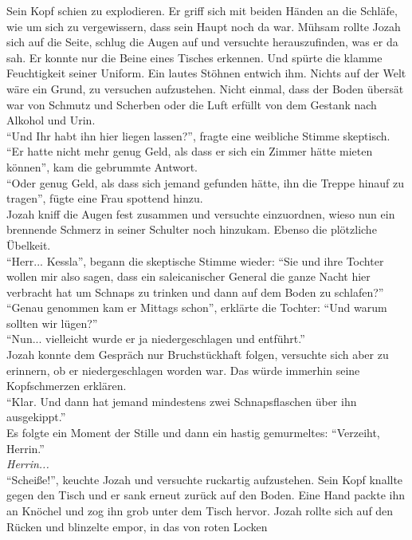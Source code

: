 Sein Kopf schien zu explodieren. Er griff sich mit beiden Händen an die Schläfe, wie um sich zu 
vergewissern, dass sein Haupt noch da war. Mühsam rollte Jozah sich auf die Seite, schlug die Augen 
auf und versuchte herauszufinden, was er da sah. Er konnte nur die Beine eines Tisches erkennen. 
Und spürte die klamme Feuchtigkeit seiner Uniform. Ein lautes Stöhnen entwich ihm. Nichts auf der 
Welt wäre ein Grund, zu versuchen aufzustehen. Nicht einmal, dass der Boden übersät war von 
Schmutz und Scherben oder die Luft erfüllt von dem Gestank nach Alkohol und Urin.\\
``Und Ihr habt ihn hier liegen lassen?'', fragte eine weibliche Stimme skeptisch.\\
``Er hatte nicht mehr genug Geld, als dass er sich ein Zimmer hätte mieten können'', kam die 
gebrummte Antwort.\\
``Oder genug Geld, als dass sich jemand gefunden hätte, ihn die Treppe hinauf zu tragen'', fügte 
eine Frau spottend hinzu.\\
Jozah kniff die Augen fest zusammen und versuchte einzuordnen, wieso nun ein brennende Schmerz in 
seiner Schulter noch hinzukam. Ebenso die plötzliche Übelkeit.\\
``Herr... Kessla'', begann die skeptische Stimme wieder: ``Sie und ihre Tochter wollen mir also 
sagen, dass ein saleicanischer General die ganze Nacht hier verbracht hat um Schnaps zu trinken und 
dann auf dem Boden zu schlafen?''\\
``Genau genommen kam er Mittags schon'', erklärte die Tochter: ``Und warum sollten wir lügen?''\\
``Nun... vielleicht wurde er ja niedergeschlagen und entführt.''\\
Jozah konnte dem Gespräch nur Bruchstückhaft folgen, versuchte sich aber zu erinnern, ob er 
niedergeschlagen worden war. Das würde immerhin seine Kopfschmerzen erklären.\\
``Klar. Und dann hat jemand mindestens zwei Schnapsflaschen über ihn ausgekippt.''\\
Es folgte ein Moment der Stille und dann ein hastig gemurmeltes: ``Verzeiht, Herrin.''\\
\textit{Herrin...}\\
``Scheiße!'', keuchte Jozah und versuchte ruckartig aufzustehen. Sein Kopf knallte gegen den Tisch 
und er sank erneut zurück auf den Boden. Eine Hand packte ihn an Knöchel und zog ihn grob unter dem 
Tisch hervor. Jozah rollte sich auf den Rücken und blinzelte empor, in das von roten Locken 
